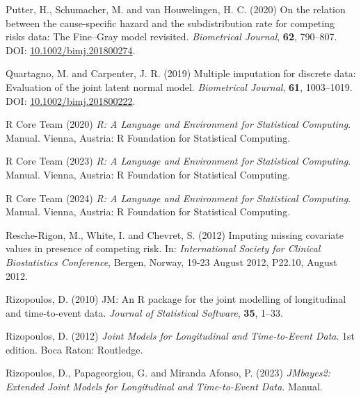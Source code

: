 \documentclass[
  letterpaper,
  paper=240mm:170mm,
  twoside=true,
  open=right,
  fontsize=10pt,
  pagesize=false,
  BCOR=15mm,
  DIV=14,
  headinclude=true,
  footinclude=false,
  headsepline=on]{scrbook}
\newlength{\cslhangindent}
\newenvironment{CSLReferences}[2] %
 {\begin{list}{}{%
  \setlength{\itemindent}{0pt}
  \setlength{\leftmargin}{0pt}
  \setlength{\parsep}{0pt}
  \ifodd #1
   \setlength{\leftmargin}{\cslhangindent}
   \setlength{\itemindent}{-1\cslhangindent}
  \fi
  \setlength{\itemsep}{#2\baselineskip}}}
 {\end{list}}
\begin{document}
\begin{CSLReferences}{1}{1}
Putter, H., Schumacher, M. and van Houwelingen, H. C. (2020) On the
relation between the cause-specific hazard and the subdistribution rate
for competing risks data: {The Fine}--{Gray} model revisited.
\emph{Biometrical Journal}, \textbf{62}, 790--807. DOI:
\href{https://doi.org/10.1002/bimj.201800274}{10.1002/bimj.201800274}.

Quartagno, M. and Carpenter, J. R. (2019) Multiple imputation for
discrete data: {Evaluation} of the joint latent normal model.
\emph{Biometrical Journal}, \textbf{61}, 1003--1019. DOI:
\href{https://doi.org/10.1002/bimj.201800222}{10.1002/bimj.201800222}.

R Core Team (2020) \emph{R: {A} Language and Environment for Statistical
Computing}. Manual. Vienna, Austria: R Foundation for Statistical
Computing.

R Core Team (2023) \emph{R: {A} Language and Environment for Statistical
Computing}. Manual. Vienna, Austria: R Foundation for Statistical
Computing.

R Core Team (2024) \emph{R: A Language and Environment for Statistical
Computing}. Manual. Vienna, Austria: R Foundation for Statistical
Computing.

Resche-Rigon, M., White, I. and Chevret, S. (2012) Imputing missing
covariate values in presence of competing risk. In: \emph{International
{Society} for {Clinical Biostatistics Conference}}, Bergen, Norway,
19-23 August 2012, P22.10, August 2012.

Rizopoulos, D. (2010) {JM}: {An R} package for the joint modelling of
longitudinal and time-to-event data. \emph{Journal of Statistical
Software}, \textbf{35}, 1--33.

Rizopoulos, D. (2012) \emph{Joint {Models} for {Longitudinal} and
{Time-to-Event Data}}. 1st edition. Boca Raton: Routledge.

Rizopoulos, D., Papageorgiou, G. and Miranda Afonso, P. (2023)
\emph{{JMbayes2}: {Extended} Joint Models for Longitudinal and
Time-to-Event Data}. Manual.


\end{CSLReferences}
\end{document}
